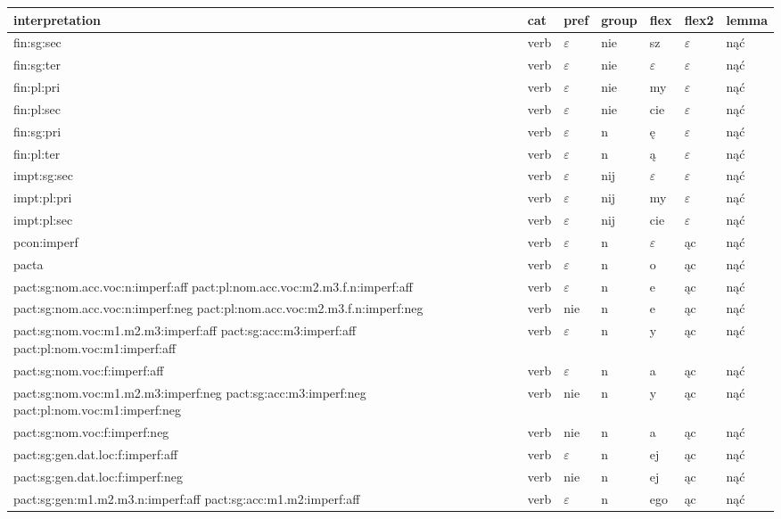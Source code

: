 \documentclass{article}
\begin{document}
\begin{longtable}{p{7cm}|l|l|l|l|l|l}
interpretation & cat & pref & group & flex & flex2 & lemma\\
\hline
fin:sg:sec & verb & $\varepsilon$ & nie & sz & $\varepsilon$ & nąć\\
fin:sg:ter & verb & $\varepsilon$ & nie & $\varepsilon$ & $\varepsilon$ & nąć\\
fin:pl:pri & verb & $\varepsilon$ & nie & my & $\varepsilon$ & nąć\\
fin:pl:sec & verb & $\varepsilon$ & nie & cie & $\varepsilon$ & nąć\\
fin:sg:pri & verb & $\varepsilon$ & n & ę & $\varepsilon$ & nąć\\
fin:pl:ter & verb & $\varepsilon$ & n & ą & $\varepsilon$ & nąć\\
impt:sg:sec & verb & $\varepsilon$ & nij & $\varepsilon$ & $\varepsilon$ & nąć\\
impt:pl:pri & verb & $\varepsilon$ & nij & my & $\varepsilon$ & nąć\\
impt:pl:sec & verb & $\varepsilon$ & nij & cie & $\varepsilon$ & nąć\\
pcon:imperf & verb & $\varepsilon$ & n & $\varepsilon$ & ąc & nąć\\
pacta & verb & $\varepsilon$ & n & o & ąc & nąć\\
pact:sg:nom.acc.voc:n:imperf:aff pact:pl:nom.acc.voc:m2.m3.f.n:imperf:aff & verb & $\varepsilon$ & n & e & ąc & nąć\\
pact:sg:nom.acc.voc:n:imperf:neg pact:pl:nom.acc.voc:m2.m3.f.n:imperf:neg & verb & nie & n & e & ąc & nąć\\
pact:sg:nom.voc:m1.m2.m3:imperf:aff pact:sg:acc:m3:imperf:aff pact:pl:nom.voc:m1:imperf:aff & verb & $\varepsilon$ & n & y & ąc & nąć\\
pact:sg:nom.voc:f:imperf:aff & verb & $\varepsilon$ & n & a & ąc & nąć\\
pact:sg:nom.voc:m1.m2.m3:imperf:neg pact:sg:acc:m3:imperf:neg pact:pl:nom.voc:m1:imperf:neg & verb & nie & n & y & ąc & nąć\\
pact:sg:nom.voc:f:imperf:neg & verb & nie & n & a & ąc & nąć\\
pact:sg:gen.dat.loc:f:imperf:aff & verb & $\varepsilon$ & n & ej & ąc & nąć\\
pact:sg:gen.dat.loc:f:imperf:neg & verb & nie & n & ej & ąc & nąć\\
pact:sg:gen:m1.m2.m3.n:imperf:aff pact:sg:acc:m1.m2:imperf:aff & verb & $\varepsilon$ & n & ego & ąc & nąć\\

\end{longtable}
\end{document}
